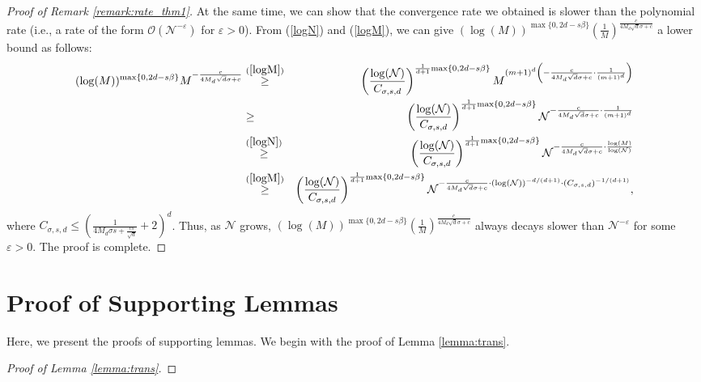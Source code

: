 \documentclass{article}
\numberwithin{equation}{section}
\begin{document}
\begin{appendices}
\begin{proof}[Proof of Remark \ref{remark:rate_thm1}]
At the same time, we can show that the convergence rate we obtained is slower than the polynomial rate (i.e., a rate of the form $\mathcal{O}(\mathcal{N}^{-\varepsilon})$ for $\varepsilon>0$). From (\ref{logN}) and (\ref{logM}), we can give $(\log (M))^{\max\{0, 2d-s\beta\}}\left(\frac{1}{M}\right)^{\frac{c}{4M_d \sqrt{d}\sigma+c}}$ a lower bound as follows:
\begin{eqnarray*}
    (\log (M))^{\max\{0, 2d-s\beta\}}M^{-\frac{c}{4M_d \sqrt{d}\sigma+c}}
    &\overset{(\ref{logM})}{\geq}& \left(\frac{\log (\mathcal{N})}{C_{\sigma, s, d}}\right)^{\frac{1}{d+1}{\max\{0, 2d-s\beta\}}}M^{(m+1)^d \left(-\frac{c}{4M_d \sqrt{d}\sigma+c}\cdot \frac{1}{(m+1)^d}\right)} \\
    &\geq& \left(\frac{\log (\mathcal{N})}{C_{\sigma, s, d}}\right)^{\frac{1}{d+1}{\max\{0, 2d-s\beta\}}}\mathcal{N}^{-\frac{c}{4M_d \sqrt{d}\sigma+c} \cdot \frac{1}{(m+1)^d}}\\
    &\overset{(\ref{logN})}{\geq}&\left(\frac{\log (\mathcal{N})}{C_{\sigma, s, d}}\right)^{\frac{1}{d+1}{\max\{0, 2d-s\beta\}}}\mathcal{N}^{-\frac{c}{4M_d \sqrt{d}\sigma+c} \cdot \frac{\log (M)}{\log(\mathcal{N})}}\\
    &\overset{(\ref{logM})}{\geq}& \left(\frac{\log (\mathcal{N})}{C_{\sigma, s, d}}\right)^{\frac{1}{d+1}{\max\{0, 2d-s\beta\}}}\mathcal{N}^{-\frac{c}{4M_d \sqrt{d}\sigma+c} \cdot (\log (\mathcal{N}))^{-d/(d+1)}\cdot (C_{\sigma, s, d})^{-1/(d+1)}},
\end{eqnarray*}
where $C_{\sigma, s, d}\leq \left(\frac{1}{4M_d\sigma s + \frac{cs}{\sqrt{d}}}+2\right )^d$. 
Thus, as $\mathcal{N}$ grows,
$(\log (M))^{\max\{0, 2d-s\beta\}}\left(\frac{1}{M}\right)^{\frac{c}{4M_d \sqrt{d}\sigma+c}}$ always decays slower than $\mathcal{N}^{-\varepsilon}$ for some $\varepsilon > 0$. The proof is complete. 
\end{proof}



\section{Proof of Supporting Lemmas}\label{sec:appendA}
Here, we present the proofs of supporting lemmas. We begin with the proof of Lemma \ref{lemma:trans}.

\begin{proof}[Proof of Lemma \ref{lemma:trans}]


\end{proof}
\end{appendices}
\end{document}
